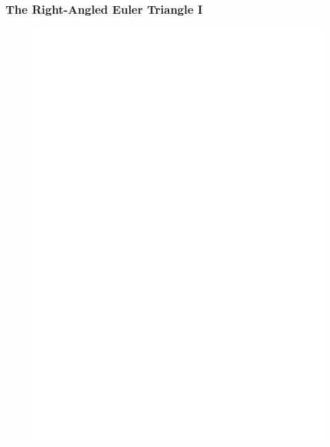 \documentclass[xcolor=dvipsnames]{beamer}
\begin{document}
\begin{frame}
  \frametitle{The Right-Angled Euler Triangle I}
  \begin{figure}[h]
    \includegraphics[scale=.7]{./bcita-04.eps}
  \end{figure}
\end{frame}
\end{document}
